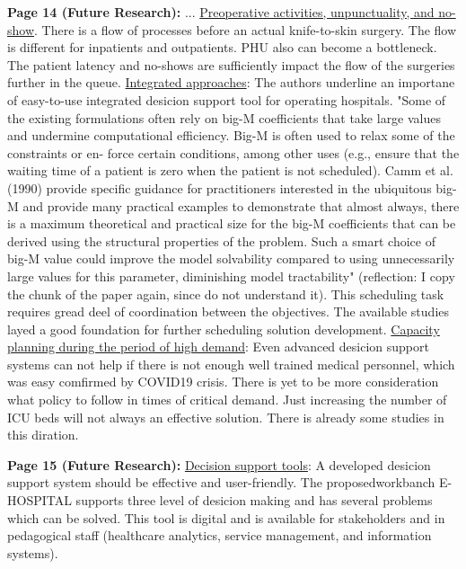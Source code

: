     \textbf{Page 14 (Future Research):}
    ... \underline{Preoperative activities, unpunctuality, and no-show}. There is a flow of processes before an actual knife-to-skin surgery. The flow is different for inpatients and outpatients. PHU also can become a bottleneck. The patient latency and no-shows are sufficiently impact the flow of the surgeries further in the queue. \underline{Integrated approaches}: The authors underline an importane of easy-to-use integrated desicion support tool for operating hospitals. "Some of the existing formulations often rely on big-M coefficients that take large values and undermine computational efficiency. Big-M is often used to relax some of the constraints or en- force certain conditions, among other uses (e.g., ensure that the waiting time of a patient is zero when the patient is not scheduled). Camm et al. (1990) provide specific guidance for practitioners interested in the ubiquitous big-M and provide many practical examples to demonstrate that almost always, there is a maximum theoretical and practical size for the big-M coefficients that can be derived using the structural properties of the problem. Such a smart choice of big-M value could improve the model solvability compared to using unnecessarily large values for this parameter, diminishing model tractability" (reflection: I copy the chunk of the paper again, since do not understand it). This scheduling task requires gread deel of coordination between the objectives. The available studies layed a good foundation for further scheduling solution development. \underline{Capacity planning during the period of high demand}: Even advanced desicion support systems can not help if there is not enough well trained medical personnel, which was easy comfirmed by COVID19 crisis. There is yet to be more consideration what policy to follow in times of critical demand. Just increasing the number of ICU beds will not always an effective solution. There is already some studies in this diration.

    \textbf{Page 15 (Future Research):}
    \underline{Decision support tools}: A developed desicion support system should be effective and user-friendly. The proposedworkbanch E-HOSPITAL supports three level of desicion making and has several problems which can be solved. This tool is digital and is available for stakeholders and in pedagogical staff (healthcare analytics, service management, and information systems).

